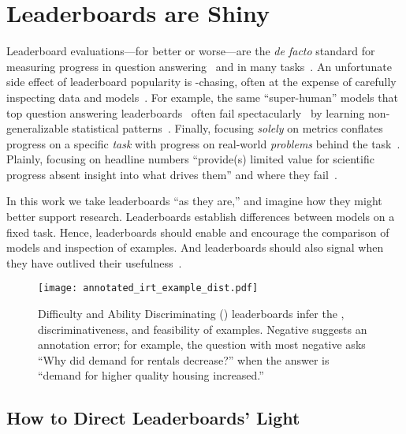 \section{Leaderboards are Shiny}
\label{ch:isicle:intro}

Leaderboard evaluations---for better or worse---are the
\textit{de facto} standard for measuring progress in question
answering~\citep{squad16} and in many \nlp{}
tasks~\citep{wang2019superglue}.
%
An unfortunate side effect of leaderboard popularity is -chasing, often at the expense of carefully inspecting data and models~\citep{linzen2020progress}.
For example, the same  ``super-human'' models that top question answering leaderboards~\citep{najberg-18} often fail spectacularly~\citep{feng2018rawr,wallace2019universal} by learning non-generalizable statistical patterns~\citep{mccoy2019heuristics,niven2019probing}.
Finally, focusing \textit{solely} on metrics conflates progress on a specific \emph{task} with progress on real-world \nlp{} \emph{problems} behind the task~\citep{bender2020climbing}.
Plainly, focusing on headline  numbers ``provide(s) limited value for scientific progress absent insight into what drives them'' and where they fail~\citep{lipton2019troubling}.

In this work we take leaderboards ``as they are,'' and imagine how they
might better support research.
%
Leaderboards establish differences between
models on a fixed task.
%
Hence, leaderboards should enable and encourage the comparison of models and
inspection of examples.
%
And leaderboards should also signal when they have outlived their usefulness~\citep{boydgraber2020nerds}.

\begin{figure}[t]
  \centering
  \texttt{[image: annotated\_irt\_example\_dist.pdf]}
  \caption{
    Difficulty and Ability Discriminating (\name{}) leaderboards infer the \diff{}, discriminativeness, and feasibility of examples.
    Negative \discability{} suggests an annotation error; for example, the question with most negative \discability{}
    asks ``Why did demand for rentals decrease?'' when the answer is ``demand for higher quality housing increased.''
  }
  \label{fig:irt-dist}
\end{figure}

\subsection{How to Direct Leaderboards' Light}

